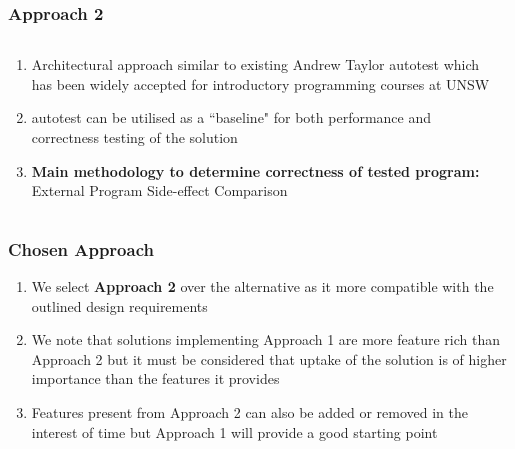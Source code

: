 \documentclass[xcolor]{beamer}
\begin{document}
\begin{frame}[fragile]
	\frametitle{Approach 2}
	\begin{columns}
		\begin{column}{0.6\textwidth}
			\begin{enumerate}
				\setlength\itemsep{0.70em}
				\item Architectural approach similar to existing Andrew Taylor autotest which has been widely accepted for introductory programming courses at UNSW
				\item autotest can be utilised as a ``baseline" for both performance and correctness testing of the solution
				\item \textbf{Main methodology to determine correctness of tested program:} External Program Side-effect Comparison
			\end{enumerate}
		\end{column}
		\begin{column}{0.35\textwidth}
			\centering
		\end{column}
	\end{columns}
\end{frame}
\begin{frame}
	\frametitle{Chosen Approach}
	\begin{enumerate}
		\setlength\itemsep{1em}
		\item We select \textbf{Approach 2} over the alternative as it more compatible with the outlined design requirements 
			\pause
		\item We note that solutions implementing Approach 1 are more feature rich than Approach 2 but it must be considered that uptake of the solution is of higher importance than the features it provides
			\pause
		\item Features present from Approach 2 can also be added or removed in the interest of time but Approach 1 will provide a good starting point
	\end{enumerate}
\end{frame}
\end{document}
